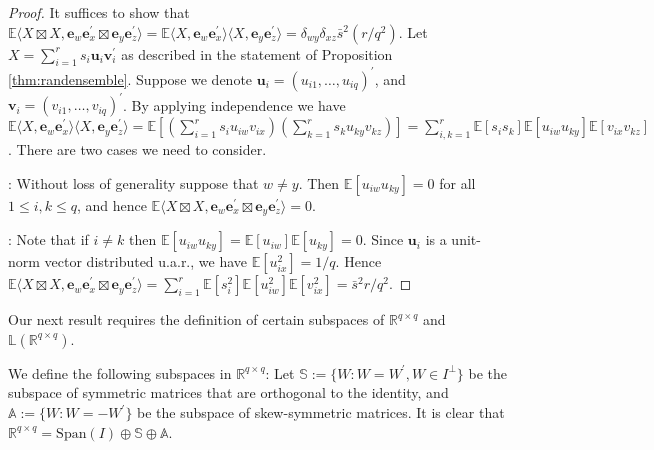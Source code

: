 \documentclass[11pt,letterpaper]{article}
\newcommand{\R}{\mathbb{R}}
\newcommand{\be}{\mathbf{e}}
\newcommand{\bu}{\mathbf{u}}
\newcommand{\bv}{\mathbf{v}}
\begin{document}
\begin{proof}
	It suffices to show that $\mathbb{E} \langle X \boxtimes X,\be_w \be_x^{\prime} \boxtimes \be_y \be_z^{\prime} \rangle = \mathbb{E} \langle X, \be_w \be_x^{\prime}\rangle \langle X, \be_y \be_z^{\prime}\rangle = \delta_{wy} \delta_{xz} \bar{s}^2 (r/q^2)$. Let $X = \sum_{i=1}^{r} s_{i} \bu_{i} \bv_{i}^{\prime}$ as described in the statement of Proposition \ref{thm:randensemble}. Suppose we denote $\bu_{i} = (u_{i1},\ldots,u_{iq})^{\prime}$, and $\bv_{i} = (v_{i1},\ldots,v_{iq})^{\prime}$. By applying independence we have $\mathbb{E} \langle X, \be_w \be_x^{\prime}\rangle \langle X, \be_y \be_z^{\prime}\rangle = \mathbb{E}[(\sum_{i=1}^{r} s_i u_{iw} v_{ix})(\sum_{k=1}^{r} s_k u_{ky} v_{kz})] = \sum_{i,k=1}^{r} \mathbb{E}[s_{i}s_{k}] \mathbb{E}[u_{iw}u_{ky}] \mathbb{E}[v_{ix}v_{kz}]$.  There are two cases we need to consider.
	
	: Without loss of generality suppose that $w \neq y$. Then $\mathbb{E}[u_{iw}u_{ky}]=0$ for all $1\leq i,k \leq q$, and hence $\mathbb{E} \langle X \boxtimes X,\be_w \be_x^{\prime} \boxtimes \be_y \be_z^{\prime} \rangle =0$.
	
	\noindent [Case $w=y$ and $x=z$]: Note that if $i \neq k$ then $\mathbb{E}[u_{iw}u_{ky}]=\mathbb{E}[u_{iw}] \mathbb{E}[u_{ky}]=0$.  Since $\bu_i$ is a unit-norm vector distributed u.a.r., we have $\mathbb{E}[u_{ix}^2] = 1/q$. Hence $\mathbb{E} \langle X \boxtimes X,\be_w \be_x^{\prime} \boxtimes \be_y \be_z^{\prime} \rangle = \sum_{i=1}^{r} \mathbb{E}[s_{i}^2] \mathbb{E}[u_{iw}^2] \mathbb{E}[v_{ix}^2] = \bar{s}^2 r /q^2$. 
\end{proof}


Our next result requires the definition of certain subspaces of $\R^{q\times q}$ and $\mathbb{L}(\R^{q\times q})$.

We define the following subspaces in $\mathbb{R}^{q\times q}$: Let $\mathbb{S}:=\{W : W = W^{\prime}, W \in I^{\perp} \}$ be the subspace of symmetric matrices that are orthogonal to the identity, and $\mathbb{A}:=\{W : W = -W^{\prime}\}$ be the subspace of skew-symmetric matrices. It is clear that $\mathbb{R}^{q\times q} = \mathrm{Span}(I) \oplus \mathbb{S} \oplus \mathbb{A}$.
\end{document}
